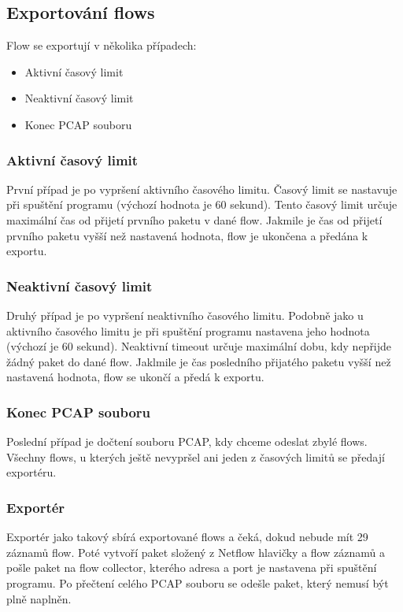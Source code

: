 \documentclass{article}
\begin{document}
\subsection{Exportování flows}

Flow se exportují v několika případech:
\begin{itemize}
    \item Aktivní časový limit
    \item Neaktivní časový limit
    \item Konec PCAP souboru
\end{itemize}

\subsubsection{Aktivní časový limit}
První případ je po vypršení aktivního časového limitu. Časový limit se
nastavuje při spuštění programu (výchozí hodnota je 60 sekund). Tento časový
limit určuje maximální čas od přijetí prvního paketu v dané flow. Jakmile je
čas od přijetí prvního paketu vyšší než nastavená hodnota, flow je ukončena
a předána k exportu.

\subsubsection{Neaktivní časový limit}
Druhý případ je po vypršení neaktivního časového limitu. Podobně jako u
aktivního časového limitu je při spuštění programu nastavena jeho hodnota
(výchozí je 60 sekund). Neaktivní timeout určuje maximální dobu, kdy nepřijde
žádný paket do dané flow. Jaklmile je čas posledního přijatého paketu vyšší
než nastavená hodnota, flow se ukončí a předá k exportu.

\subsubsection{Konec PCAP souboru}
Poslední případ je dočtení souboru PCAP, kdy chceme odeslat zbylé flows.
Všechny flows, u kterých ještě nevypršel ani jeden z časových limitů se předají
exportéru.

\subsubsection{Exportér}
Exportér jako takový sbírá exportované flows a čeká, dokud nebude mít 29
záznamů flow. Poté vytvoří paket složený z Netflow hlavičky a flow záznamů a
pošle paket na flow collector, kterého adresa a port je nastavena při spuštění
programu. Po přečtení celého PCAP souboru se odešle paket, který nemusí být
plně naplněn.
\end{document}

